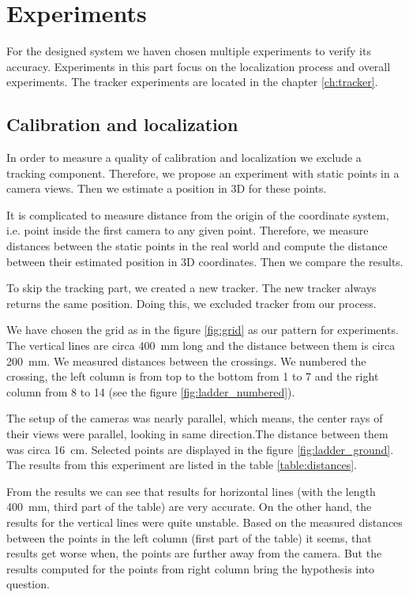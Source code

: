 \chapter{Experiments} 

For the designed system we haven chosen multiple experiments to
verify its accuracy. Experiments in this part focus on the localization process
and overall experiments. The tracker experiments are located in the chapter
\ref{ch:tracker}.

\section{Calibration and localization}
\label{s:experiment-static}

In order to measure a quality of calibration and localization we exclude a
tracking component. Therefore, we propose an experiment with static points in a
camera views. Then we estimate a position in 3D for these points.

It is complicated to measure distance from the origin of the coordinate system,
i.e. point inside the first camera to any given point. Therefore, we measure
distances between the static points in the real world and compute the distance
between their estimated position in 3D coordinates. Then we compare the results.

To skip the tracking part, we created a new tracker.  The new tracker always
returns the same position.  Doing this, we excluded tracker from our process.

We have chosen the grid as in the figure \ref{fig:grid} as our pattern for experiments.
The vertical lines are circa 400~mm long and the distance between them is circa
200~mm. We measured distances between the crossings. We numbered the crossing,
the left column is from top to the bottom from 1 to 7 and the right column from
8 to 14 (see the figure \ref{fig:ladder_numbered}).

The setup of the cameras was nearly parallel, which means, the center rays of
their views were parallel, looking in same direction.The distance between them
was circa 16~cm. Selected points are displayed in the figure
\ref{fig:ladder_ground}. The results from this experiment are listed in the
table \ref{table:distances}. 

From the results we can see that results for horizontal lines (with the length
400~mm, third part of the table) are very accurate. On the other hand, the
results for the vertical lines were quite unstable. Based on the measured
distances between the points in the left column (first part of the table) it
seems, that results get worse when, the points are further away from the
camera. But the results computed for the points from right column bring the
hypothesis into question. 

